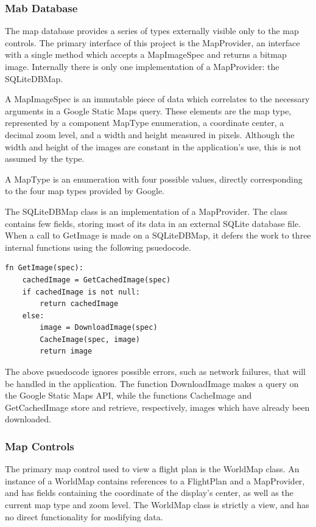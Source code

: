 \documentclass[12pt, letterpaper]{article}
\begin{document}
\newpage
\subsubsection{Mab Database}
The map database provides a series of types externally visible only to the map controls.
The primary interface of this project is the MapProvider, an interface with a single method which accepts a MapImageSpec and returns a bitmap image.
Internally there is only one implementation of a MapProvider: the SQLiteDBMap.


A MapImageSpec is an immutable piece of data which correlates to the necessary arguments in a Google Static Maps query.
These elements are the map type, represented by a component MapType enumeration, a coordinate center, a decimal zoom level, and a width and height measured in pixels.
Although the width and height of the images are constant in the application's use, this is not assumed by the type.

A MapType is an enumeration with four possible values, directly corresponding to the four map types provided by Google.

The SQLiteDBMap class is an implementation of a MapProvider.
The class contains few fields, storing most of its data in an external SQLite database file.
When a call to GetImage is made on a SQLiteDBMap, it defers the work to three internal functions using the following psuedocode.

\begin{lstlisting}
fn GetImage(spec):
    cachedImage = GetCachedImage(spec)
    if cachedImage is not null:
        return cachedImage
    else:
        image = DownloadImage(spec)
        CacheImage(spec, image)
        return image
\end{lstlisting}

The above psuedocode ignores possible errors, such as network failures, that will be handled in the application.
The function DownloadImage makes a query on the Google Static Maps API,
while the functions CacheImage and GetCachedImage store and retrieve, respectively, images which have already been downloaded.

\subsubsection{Map Controls}
The primary map control used to view a flight plan is the WorldMap class.
An instance of a WorldMap contains references to a FlightPlan and a MapProvider,
and has fields containing the coordinate of the display's center, as well as the current map type and zoom level.
The WorldMap class is strictly a view, and has no direct functionality for modifying data.
\end{document}
